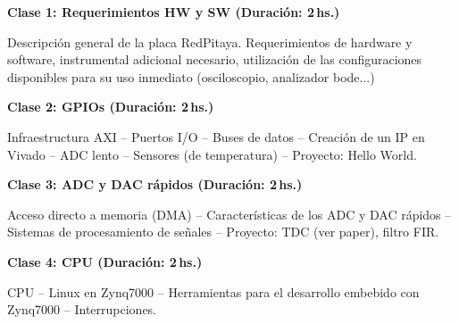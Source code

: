 \documentclass[11pt]{exam}
\begin{document}
\begin{questions}

	\question \textbf{Clase 1: Requerimientos HW y SW (Duración: 2\,hs.)}
	
	Descripción general de la placa RedPitaya. Requerimientos de hardware y
	software, instrumental adicional necesario, utilización de las configuraciones
	disponibles para su uso inmediato (osciloscopio, analizador bode...)

	\question \textbf{Clase 2: GPIOs (Duración: 2\,hs.)} 

	Infraestructura AXI -- Puertos I/O -- Buses de datos -- Creación de un IP en Vivado -- ADC lento
	-- Sensores (de temperatura) -- Proyecto:	Hello World.

	\question \textbf{Clase 3: ADC y DAC rápidos (Duración: 2\,hs.)}

	Acceso directo a memoria (DMA) -- Características de los ADC y DAC rápidos --
	Sistemas de procesamiento de señales -- Proyecto: TDC (ver paper), filtro FIR. 

	\question \textbf{Clase 4: CPU (Duración: 2\,hs.)}

	CPU -- Linux en Zynq7000 -- Herramientas para el desarrollo embebido con Zynq7000
	-- Interrupciones.

%



\end{questions}
\end{document}
